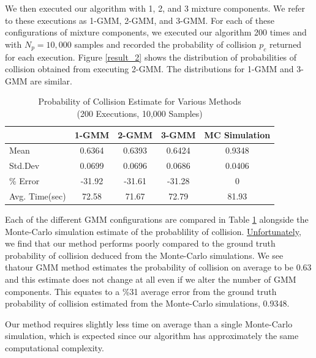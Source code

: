 \documentclass[journal]{IEEEtran}
\begin{document}
We then executed our algorithm with 1, 2, and 3 mixture components. We refer to these executions as 1-GMM, 2-GMM, and 3-GMM. For each of these configurations of mixture components, we executed our algorithm 200 times and with $N_p=10,000$ samples and recorded the probability of collision $p_c$ returned for each execution. Figure \ref{result_2} shows the distribution of probabilities of collision obtained from executing 2-GMM. The distributions for 1-GMM and 3-GMM are similar.

\begin{table}[h!]
  \begin{center}
    \caption{Probability of Collision Estimate for Various Methods\\(200 Executions, 10,000 Samples)}
    \label{tab:table1}
    \begin{tabular}{l|c|c|c|c} %
      \textbf{} & \textbf{1-GMM} & \textbf{2-GMM} & \textbf{3-GMM} & \textbf{MC Simulation}\\
      \hline
      Mean & 0.6364 & 0.6393 & 0.6424 & 0.9348\\
      Std.Dev & 0.0699 & 0.0696 & 0.0686 & 0.0406\\
      \% Error & -31.92 & -31.61 & -31.28 & 0\\
      Avg. Time(sec) & 72.58 & 71.67 & 72.79 & 81.93\\      
    \end{tabular}
  \end{center}
\end{table}

Each of the different GMM configurations are compared in Table \ref{tab:table1} alongside the Monte-Carlo simulation estimate of the probablility of collision. \underline{Unfortunately}, we find that our method performs poorly compared to the ground truth probability of collision deduced from the Monte-Carlo simulations. We see thatour GMM method estimates the probability of collision on average to be 0.63 and this estimate does not change at all even if we alter the number of GMM components. This equates to a \%31 average error from the ground truth probability of collision estimated from the Monte-Carlo simulations, 0.9348.

Our method requires slightly less time on average than a single Monte-Carlo simulation, which is expected since our algorithm has approximately the same computational complexity.
\end{document}
